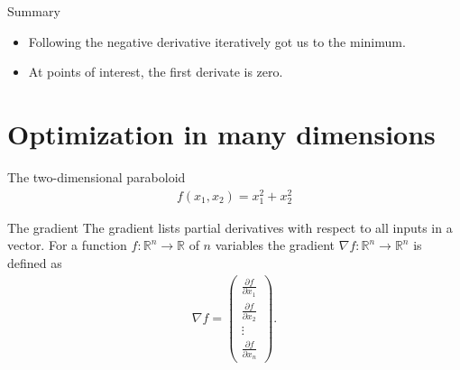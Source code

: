 \documentclass{beamer}
\begin{document}
    \begin{frame}{Summary}
      \begin{itemize}
        \item Following the negative derivative iteratively got us to the minimum.
        \item At points of interest, the first derivate is zero. 
      \end{itemize}
    \end{frame}

    \section{Optimization in many dimensions}

    \begin{frame}{The two-dimensional paraboloid}
      \begin{align}
        f(x_1, x_2) = x_1^2 + x_2^2
      \end{align}
      \begin{figure}
        \centering
        
      \end{figure}
    \end{frame}

    \begin{frame}{The gradient}
      The gradient lists partial derivatives with respect to all inputs in a vector.
      For a function $f : \mathbb{R}^n \rightarrow \mathbb{R}$ of $n$ variables the gradient
      $\nabla f: \mathbb{R}^n \rightarrow \mathbb{R}^n$ is defined as
      \begin{align}
        \nabla f = \begin{pmatrix}
          \frac{\partial f}{\partial x_1} \\
          \frac{\partial f}{\partial x_2} \\
          \vdots \\
          \frac{\partial f}{\partial x_n} 
        \end{pmatrix}.
      \end{align}
    \end{frame}
\end{document}
